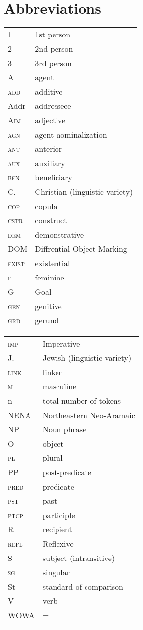 \documentclass[output=paper,colorlinks,citecolor=brown,draftmode]{langscibook}
\begin{document}
\section*{Abbreviations}
\begin{tabularx}{.5\textwidth}{@{}lQ@{}}
1 & 1st person \\
2 & 2nd person \\
3 & 3rd person \\
A & agent \\
\textsc{add} & additive \\
Addr & addresseee \\
\textsc{Adj} & {adjective} \\
\textsc{agn} & agent nominalization \\
\textsc{ant} & anterior \\
\textsc{aux} & {auxiliary} \\
\textsc{ben} & beneficiary \\
C. & Christian (linguistic variety) \\
\textsc{cop} & {copula} \\
\textsc{cstr} & construct \\
\textsc{dem} & demonstrative \\
{DOM} & Diffrential Object Marking \\
\textsc{exist} & existential \\
\textsc{f} & feminine \\
G & {Goal} \\
\textsc{gen} & genitive \\
\textsc{grd} & gerund \\
\end{tabularx}%
\begin{tabularx}{.5\textwidth}{@{}lQ@{}}
\textsc{imp} & Imperative \\
J. & Jewish (linguistic variety) \\
\textsc{link} & linker \\
\textsc{m} & masculine \\
n & total number of tokens \\
NENA & Northeastern Neo-Aramaic \\
NP & Noun phrase \\
O & {object} \\
\textsc{pl} & plural \\
PP & post-predicate \\
\textsc{pred} & predicate \\
\textsc{pst} & past \\
\textsc{ptcp} & participle \\
R & {recipient} \\
\textsc{refl} & Reflexive \\
S & subject (intransitive) \\
\textsc{sg} & singular \\
St & standard of comparison \\
V & {verb} \\
WOWA & = \citet{Haig.Stilo.Dogan.Schiborr2022} \\
& \\
\end{tabularx}
\end{document}
